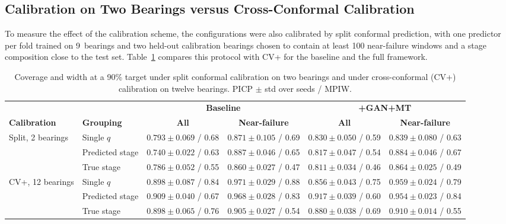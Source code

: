 \subsection{Calibration on Two Bearings versus Cross-Conformal Calibration}
\label{sec:res_calibration}

To measure the effect of the calibration scheme, the configurations
were also calibrated by split conformal prediction, with one predictor
per fold trained on 9~bearings and two held-out calibration bearings
chosen to contain at least 100 near-failure windows and a stage
composition close to the test set. Table~\ref{tab:calibration}
compares this protocol with CV+ for the baseline and the full
framework.

\begin{table}[!htbp]
\centering
\caption{Coverage and width at a 90\% target under split conformal
calibration on two bearings and under cross-conformal (CV+)
calibration on twelve bearings. PICP $\pm$ std over seeds / MPIW.}
\label{tab:calibration}
\scriptsize
\renewcommand{\arraystretch}{1.2}
\setlength{\tabcolsep}{4pt}
\begin{tabular}{llcccc}
\toprule
& & \multicolumn{2}{c}{\textbf{Baseline}} & \multicolumn{2}{c}{\textbf{+GAN+MT}} \\
\cmidrule(lr){3-4}\cmidrule(lr){5-6}
\textbf{Calibration} & \textbf{Grouping} & \textbf{All} & \textbf{Near-failure} & \textbf{All} & \textbf{Near-failure} \\
\midrule
\multirow{3}{*}{Split, 2 bearings}
 & Single $q$        & $0.793 \pm 0.069$ / 0.68 & $0.871 \pm 0.105$ / 0.69 & $0.830 \pm 0.050$ / 0.59 & $0.839 \pm 0.080$ / 0.63 \\
 & Predicted stage   & $0.740 \pm 0.022$ / 0.63 & $0.887 \pm 0.046$ / 0.65 & $0.817 \pm 0.047$ / 0.54 & $0.884 \pm 0.046$ / 0.67 \\
 & True stage        & $0.786 \pm 0.052$ / 0.55 & $0.860 \pm 0.027$ / 0.47 & $0.811 \pm 0.034$ / 0.46 & $0.864 \pm 0.025$ / 0.49 \\
\midrule
\multirow{3}{*}{CV+, 12 bearings}
 & Single $q$        & $0.898 \pm 0.087$ / 0.84 & $0.971 \pm 0.029$ / 0.88 & $0.856 \pm 0.043$ / 0.75 & $0.959 \pm 0.024$ / 0.79 \\
 & Predicted stage   & $\mathbf{0.909 \pm 0.040}$ / 0.67 & $0.968 \pm 0.028$ / 0.83 & $\mathbf{0.917 \pm 0.039}$ / 0.60 & $0.954 \pm 0.023$ / 0.84 \\
 & True stage        & $0.898 \pm 0.065$ / 0.76 & $0.905 \pm 0.027$ / 0.54 & $0.880 \pm 0.038$ / 0.69 & $0.910 \pm 0.014$ / 0.55 \\
\bottomrule
\end{tabular}
\end{table}

